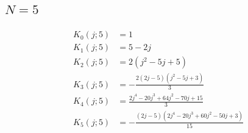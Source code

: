 \subsection{$N=5$}
\begin{align*}
K_{0}(j;5)&=1 \\
K_{1}(j;5)&=5 - 2 j \\
K_{2}(j;5)&=2 \left(j^{2} - 5 j + 5\right) \\
K_{3}(j;5)&=- \frac{2 \left(2 j - 5\right) \left(j^{2} - 5 j + 3\right)}{3} \\
K_{4}(j;5)&=\frac{2 j^{4} - 20 j^{3} + 64 j^{2} - 70 j + 15}{3} \\
K_{5}(j;5)&=- \frac{\left(2 j - 5\right) \left(2 j^{4} - 20 j^{3} + 60 j^{2} - 50 j + 3\right)}{15}
\end{align*}
